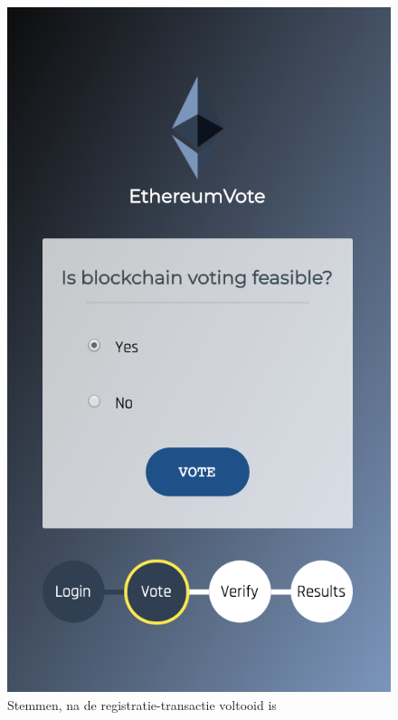 \begin{figure}
		\includegraphics[width=\linewidth/3]{img/screen_voting.png}
		\caption{Stemmen, na de registratie-transactie voltooid is}
		\label{fig:screen_voting1}
	\end{figure}
